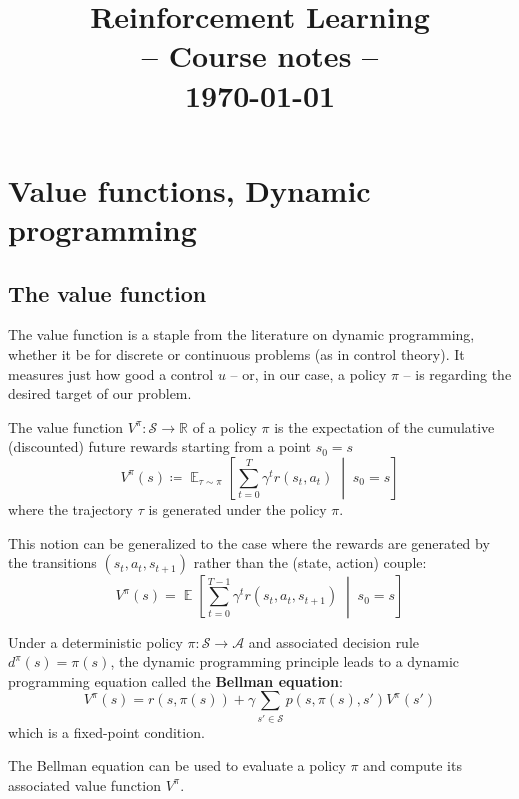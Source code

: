 \documentclass[12pt]{report}
\title{
{
	\sffamily\Huge
	\textbf{Reinforcement Learning}\\
	{\bluefont-- Course notes --}
}\\[2ex]
\normalsize\sffamily\today
}
\date{}
\newcommand\RR{\mathbb{R}}
\newcommand{\scalemid}{\;\middle|\;}
\DeclareMathOperator{\EE}{\mathbb{E}}
\newcommand{\calA}{\mathcal{A}}
\newcommand{\calS}{\mathcal{S}}
\newcommand{\bluefont}{\color{Blue}}
\begin{document}
\maketitle


\chapter{Value functions, Dynamic programming}

\section{The value function}

The value function is a staple from the literature on dynamic programming, whether it be for discrete or continuous problems (as in control theory). It measures just how good a control $u$ -- or, in our case, a policy $\pi$ -- is regarding the desired target of our problem.


\begin{defn}
The value function $V^\pi\colon \calS \to \RR$ of a policy $\pi$ is the expectation of the cumulative (discounted) future rewards starting from a point $s_0 = s$
\begin{equation}\label{eq:ValueFunctionDefn}
	V^\pi(s) \coloneqq
	\EE_{\tau\sim\pi}\left[
	\sum_{t=0}^T \gamma^t r(s_t, a_t)
	\scalemid s_0 = s
	\right]
\end{equation}
where the trajectory $\tau$ is generated under the policy $\pi$.
\end{defn}

This notion can be generalized to the case where the rewards are generated by the transitions $(s_t, a_t, s_{t+1})$ rather than the (state, action) couple:
\[
	V^\pi(s) = \EE\left[
	\sum_{t=0}^{T-1} \gamma^t r(s_t, a_t, s_{t+1})
	\scalemid s_0 = s
	\right]
\]

Under a deterministic policy $\pi\colon \calS \to \calA$ and associated decision rule $d^\pi(s) = \pi(s)$, the dynamic programming principle leads to a dynamic programming equation called the \textbf{\bluefont Bellman equation}:
\begin{equation}\label{eq:ValueBellmanEqn}
	V^\pi(s) = r(s, \pi(s)) + \gamma\sum_{s'\in\calS} p(s, \pi(s), s')V^\pi(s')
\end{equation}
which is a fixed-point condition.

The Bellman equation can be used to evaluate a policy $\pi$ and compute its associated value function $V^\pi$.
\end{document}
